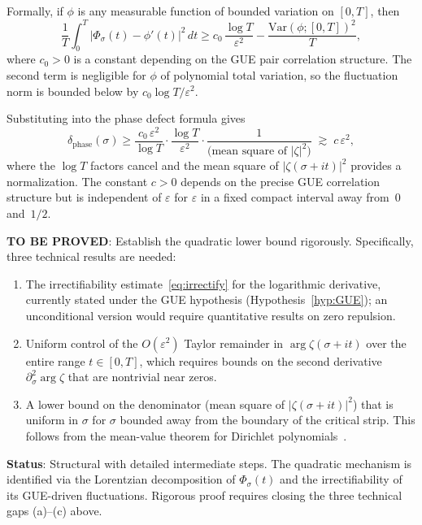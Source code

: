 \documentclass[11pt]{article}
\theoremstyle{remark}
\begin{document}
Formally, if $\phi$ is any measurable function of bounded variation on $[0,T]$,
then
\begin{equation}\label{eq:irrectify}
  \frac{1}{T}\int_0^T\bigl|\Phi_\sigma(t)-\phi'(t)\bigr|^2\,dt
  \geq c_0\,\frac{\log T}{\varepsilon^2}
  - \frac{\mathrm{Var}(\phi;[0,T])^2}{T},
\end{equation}
where $c_0>0$ is a constant depending on the GUE pair correlation structure.
The second term is negligible for $\phi$ of polynomial total variation, so the
fluctuation norm is bounded below by $c_0\log T/\varepsilon^2$.

Substituting into the phase defect formula gives
\[
  \delta_{\mathrm{phase}}(\sigma)
  \geq \frac{c_0\,\varepsilon^2}{\log T}\cdot\frac{\log T}{\varepsilon^2}
    \cdot\frac{1}{\text{(mean square of } |\zeta|^2\text{)}}
  \;\gtrsim\; c\,\varepsilon^2,
\]
where the $\log T$ factors cancel and the mean square of $|\zeta(\sigma+it)|^2$
provides a normalization.
The constant $c>0$ depends on the precise GUE correlation structure but is
independent of $\varepsilon$ for $\varepsilon$ in a fixed compact interval
away from~$0$ and~$1/2$.

\textbf{TO BE PROVED}: Establish the quadratic lower bound rigorously.
Specifically, three technical results are needed:
\begin{enumerate}
  \item[(a)] The irrectifiability estimate~\eqref{eq:irrectify} for the
    logarithmic derivative, currently stated under the GUE hypothesis
    (Hypothesis~\ref{hyp:GUE}); an unconditional version would require
    quantitative results on zero repulsion.
  \item[(b)] Uniform control of the $O(\varepsilon^2)$ Taylor remainder in
    $\arg\zeta(\sigma+it)$ over the entire range $t\in[0,T]$, which requires
    bounds on the second derivative $\partial_\sigma^2\arg\zeta$ that are
    nontrivial near zeros.
  \item[(c)] A lower bound on the denominator (mean square of
    $|\zeta(\sigma+it)|^2$) that is uniform in $\sigma$ for $\sigma$ bounded
    away from the boundary of the critical strip.
    This follows from the mean-value theorem for Dirichlet
    polynomials~\cite{Titchmarsh}.
\end{enumerate}

\medskip
\noindent\textbf{Status}: Structural with detailed intermediate steps.
The quadratic mechanism is identified via the Lorentzian decomposition of
$\Phi_\sigma(t)$ and the irrectifiability of its GUE-driven fluctuations.
Rigorous proof requires closing the three technical gaps (a)--(c) above.
\end{document}
